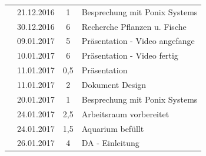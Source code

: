 \documentclass[12pt]{article}
\begin{document}
\begin{table}[hp]
\begin{tabular}{|l|r|c|l|}
                                                                                   & 21.12.2016                          & 1                                          & Besprechung mit Ponix Systems           \\ \cline{2-4} 
                                                                                   & 30.12.2016                          & 6                                          & Recherche Pflanzen u. Fische            \\ \cline{2-4} 
                                                                                   & 09.01.2017                          & 5                                          & Präsentation - Video angefange          \\ \cline{2-4} 
                                                                                   & 10.01.2017                          & 6                                          & Präsentation - Video fertig             \\ \cline{2-4} 
                                                                                   & 11.01.2017                          & 0,5                                        & Präsentation                            \\ \cline{2-4} 
                                                                                   & 11.01.2017                          & 2                                          & Dokument Design                         \\ \cline{2-4} 
                                                                                   & 20.01.2017                          & 1                                          & Besprechung mit Ponix Systems           \\ \cline{2-4} 
                                                                                   & 24.01.2017                          & 2,5                                        & Arbeitsraum vorbereitet                 \\ \cline{2-4} 
                                                                                   & 24.01.2017                          & 1,5                                        & Aquarium befüllt                        \\ \cline{2-4} 
                                                                                   & 26.01.2017                          & 4                                          & DA - Einleitung                         \\ \cline{2-4} 

\end{tabular}
\end{table}
\end{document}
